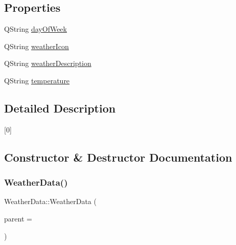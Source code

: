 \subsection*{Properties}
\begin{DoxyCompactItemize}
\item 
Q\+String \hyperlink{class_weather_data_a483043396f44ae957716ebb005644d0d}{day\+Of\+Week}
\item 
Q\+String \hyperlink{class_weather_data_aca04e1877e2d5bc6da0f1e9910553741}{weather\+Icon}
\item 
Q\+String \hyperlink{class_weather_data_a8b470bc177e317a6a6a6b51758724a1a}{weather\+Description}
\item 
Q\+String \hyperlink{class_weather_data_a2ee510e51cb81a6a479cd0af5f291e2c}{temperature}
\end{DoxyCompactItemize}


\subsection{Detailed Description}
\mbox{[}0\mbox{]} 

\subsection{Constructor \& Destructor Documentation}
\mbox{\label{class_weather_data_aae42655299392d3f90feec9911a2dd60}} 
\subsubsection{\texorpdfstring{Weather\+Data()}{WeatherData()}\hspace{0.1cm}{\footnotesize\ttfamily [1/2]}}
{\footnotesize\ttfamily Weather\+Data\+::\+Weather\+Data (\begin{DoxyParamCaption}\item[{Q\+Object $\ast$}]{parent = {} }\end{DoxyParamCaption})\hspace{0.3cm}{\ttfamily [explicit]}}

\mbox{\label{class_weather_data_a48baeaa6b2a77d2a5e008159188416e8}} 
